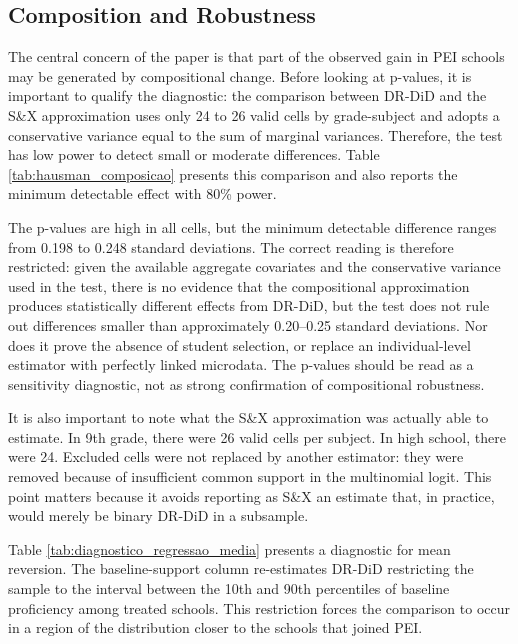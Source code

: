 \subsection{Composition and Robustness} \label{sec:robustez}

The central concern of the paper is that part of the observed gain in PEI schools may be generated by compositional change. Before looking at p-values, it is important to qualify the diagnostic: the comparison between DR-DiD and the S\&X approximation uses only 24 to 26 valid cells by grade-subject and adopts a conservative variance equal to the sum of marginal variances. Therefore, the test has low power to detect small or moderate differences. Table \ref{tab:hausman_composicao} presents this comparison and also reports the minimum detectable effect with 80\% power.



The p-values are high in all cells, but the minimum detectable difference ranges from 0.198 to 0.248 standard deviations. The correct reading is therefore restricted: given the available aggregate covariates and the conservative variance used in the test, there is no evidence that the compositional approximation produces statistically different effects from DR-DiD, but the test does not rule out differences smaller than approximately 0.20--0.25 standard deviations. Nor does it prove the absence of student selection, or replace an individual-level estimator with perfectly linked microdata. The p-values should be read as a sensitivity diagnostic, not as strong confirmation of compositional robustness.

It is also important to note what the S\&X approximation was actually able to estimate. In 9th grade, there were 26 valid cells per subject. In high school, there were 24. Excluded cells were not replaced by another estimator: they were removed because of insufficient common support in the multinomial logit. This point matters because it avoids reporting as S\&X an estimate that, in practice, would merely be binary DR-DiD in a subsample.

Table \ref{tab:diagnostico_regressao_media} presents a diagnostic for mean reversion. The baseline-support column re-estimates DR-DiD restricting the sample to the interval between the 10th and 90th percentiles of baseline proficiency among treated schools. This restriction forces the comparison to occur in a region of the distribution closer to the schools that joined PEI.

